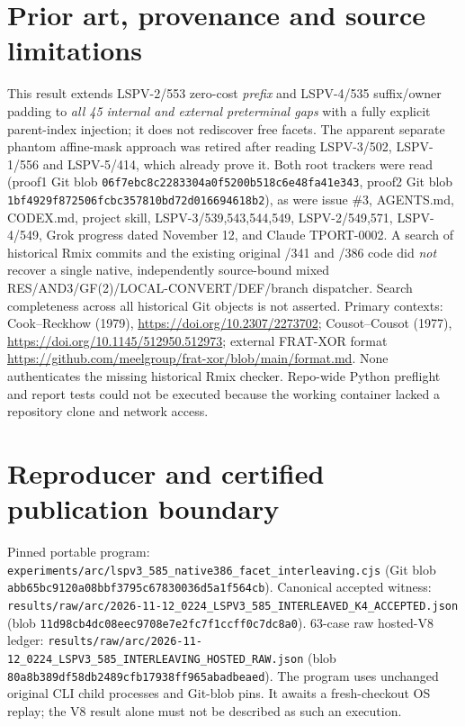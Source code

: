 \documentclass[11pt]{article}
\begin{document}
\section*{Prior art, provenance and source limitations}
This result extends LSPV-2/553 zero-cost \emph{prefix} and LSPV-4/535 suffix/owner padding to \emph{all 45 internal and external preterminal gaps} with a fully explicit parent-index injection; it does not rediscover free facets. The apparent separate phantom affine-mask approach was retired after reading LSPV-3/502, LSPV-1/556 and LSPV-5/414, which already prove it. Both root trackers were read (proof1 Git blob \texttt{06f7ebc8c2283304a0f5200b518c6e48fa41e343}, proof2 Git blob \texttt{1bf4929f872506fcbc357810bd72d016694618b2}), as were issue \#3, AGENTS.md, CODEX.md, project skill, LSPV-3/539,543,544,549, LSPV-2/549,571, LSPV-4/549, Grok progress dated November 12, and Claude TPORT-0002. A search of historical Rmix commits and the existing original /341 and /386 code did \emph{not} recover a single native, independently source-bound mixed RES/AND3/GF(2)/LOCAL-CONVERT/DEF/branch dispatcher. Search completeness across all historical Git objects is not asserted.
Primary contexts: Cook--Reckhow (1979), \url{https://doi.org/10.2307/2273702}; Cousot--Cousot (1977), \url{https://doi.org/10.1145/512950.512973}; external FRAT-XOR format \url{https://github.com/meelgroup/frat-xor/blob/main/format.md}. None authenticates the missing historical Rmix checker. Repo-wide Python preflight and report tests could not be executed because the working container lacked a repository clone and network access.

\section*{Reproducer and certified publication boundary}
Pinned portable program:
\texttt{experiments/arc/lspv3\_585\_native386\_facet\_interleaving.cjs}
(Git blob \texttt{abb65bc9120a08bbf3795c67830036d5a1f564cb}).
Canonical accepted witness:
\texttt{results/raw/arc/2026-11-12\_0224\_LSPV3\_585\_INTERLEAVED\_K4\_ACCEPTED.json}
(blob \texttt{11d98cb4dc08eec9708e7e2fc7f1ccff0c7dc8a0}).
63-case raw hosted-V8 ledger:
\texttt{results/raw/arc/2026-11-12\_0224\_LSPV3\_585\_INTERLEAVING\_HOSTED\_RAW.json}
(blob \texttt{80a8b389df58db2489cfb17938ff965abadbeaed}).
The program uses unchanged original CLI child processes and Git-blob pins. It awaits a fresh-checkout OS replay; the V8 result alone must not be described as such an execution.
\end{document}
